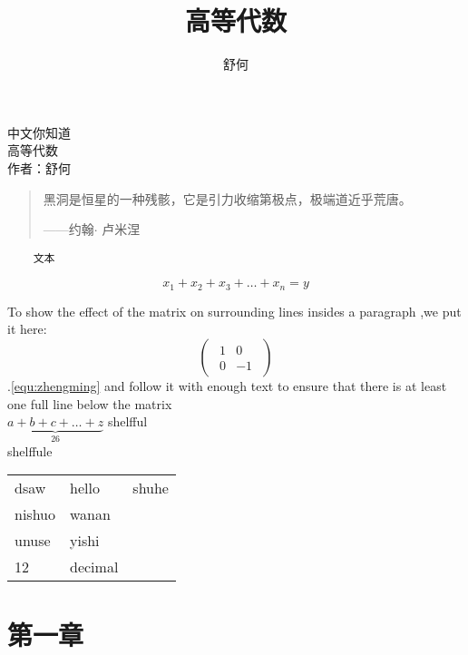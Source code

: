 \documentclass[11pt]{article}
\begin{document}
\begin{CJK}{UTF8}{gbsn}
\author{舒何}
\title{高等代数}
\maketitle
\begin{center}
	中文你知道\\[1mm]
	{\large 高等代数}\\[4mm]
	{\small 作者：舒何}
\end{center}
\begin{quotation}
黑洞是恒星的一种残骸，它是引力收缩第极点，极端道近乎荒唐。\par
\raggedleft——约翰$\cdot$ 卢米涅	
\end{quotation}
\begin{CJKverbatim}
\begin{verbatim}
	文本
\end{verbatim}
\begin{equation}
	x_1+x_2+x_3+\dots+x_n=y
\end{equation}
\end{CJKverbatim}
To show the effect of the matrix on surrounding lines insides a paragraph ,we put it here:
\begin{equation}\nonumber
\begin{pmatrix}
	\begin{smallmatrix}
		1 & 0\\
		0 & -1
	\end{smallmatrix}
\end{pmatrix}
\end{equation}
\pageref{equ:gongshi}.\ref{equ:zhengming} and follow it with enough text to ensure that there is at least one full line below the matrix\\
$\underbrace{a+b+c+\dots+z}_{26}$
shelfful\\
shelf\mbox{}fule\\
\begin{tabular}{|l|l|l|}
\hline
dsaw & hello & shuhe\\
nishuo& wanan & \\ 
\cline{2-3}
unuse & yishi &\\
\hline
\hline 12 & decimal &\\
\hline	
\end{tabular}
\section{第一章}

\end{CJK}
\end{document}
